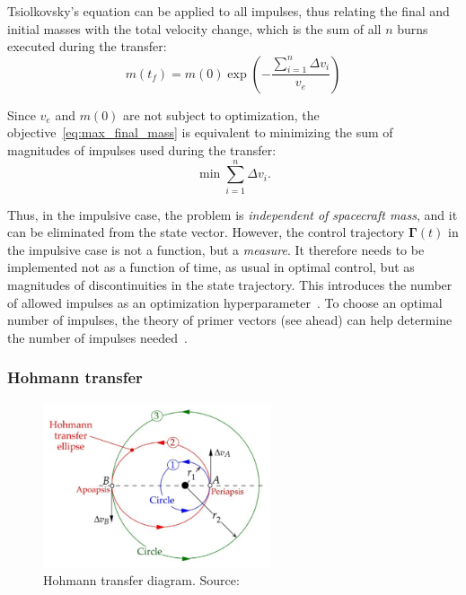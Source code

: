 Tsiolkovsky's equation can be applied to all impulses, thus relating the final and initial masses with the total velocity change, which is the sum of all \(n\) burns executed during the transfer:
\begin{equation}
    m(t_f) = m(0) \exp{\left(-\frac{\sum_{i=1}^{n}\Delta v_i}{v_e}\right)}
\end{equation}

Since \(v_e\) and \(m(0)\) are not subject to optimization, the objective~\eqref{eq:max_final_mass} is equivalent to minimizing the sum of magnitudes of impulses used during the transfer:
\begin{equation}
    \min \sum_{i=1}^{n} \Delta v_i.
\end{equation}

Thus, in the impulsive case, the problem is \textit{independent of spacecraft mass}, and it can be eliminated from the state vector. However, the control trajectory \(\mathbf{\Gamma}(t)\) in the impulsive case is not a function, but a \textit{measure}. It therefore needs to be implemented not as a function of time, as usual in optimal control, but as magnitudes of discontinuities in the state trajectory. This introduces the number of allowed impulses as an optimization hyperparameter~\cite{optimal_impulsive_control}. To choose an optimal number of impulses, the theory of primer vectors (see ahead) can help determine the number of impulses needed~\cite{interactive_primer_vector}.

\subsubsection{Hohmann transfer}\label{sssec:hohmann}

\begin{figure}[htbp]
    \centering
    \includegraphics[width=0.6\textwidth]{img/hohmann_from_curtis.png}
    \caption{Hohmann transfer diagram. Source: \cite{curtis2015orbital}}
    \label{fig:hohmann_diagram}
\end{figure}

